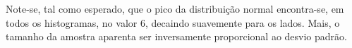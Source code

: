 \documentclass[11pt]{article}
\begin{document}

Note-se, tal como esperado, que o pico da distribuição normal encontra-se, em todos
os histogramas, no valor 6, decaindo suavemente para os lados. Mais, o tamanho da amostra aparenta ser
inversamente proporcional ao desvio padrão.
\end{document}
